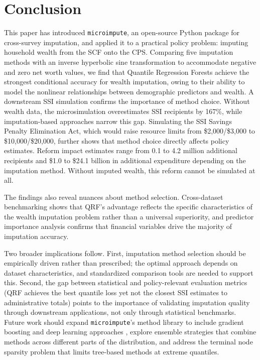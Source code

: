 \section{Conclusion}\label{sec:conclusion}

This paper has introduced \texttt{microimpute}, an open-source Python package for cross-survey imputation, and applied it to a practical policy problem: imputing household wealth from the SCF onto the CPS. Comparing five imputation methods with an inverse hyperbolic sine transformation to accommodate negative and zero net worth values, we find that Quantile Regression Forests achieve the strongest conditional accuracy for wealth imputation, owing to their ability to model the nonlinear relationships between demographic predictors and wealth. A downstream SSI simulation confirms the importance of method choice. Without wealth data, the microsimulation overestimates SSI recipients by 167\%, while imputation-based approaches narrow this gap. Simulating the SSI Savings Penalty Elimination Act, which would raise resource limits from \$2,000/\$3,000 to \$10,000/\$20,000, further shows that method choice directly affects policy estimates. Reform impact estimates range from 0.1 to 4.2 million additional recipients and \$1.0 to \$24.1 billion in additional expenditure depending on the imputation method. Without imputed wealth, this reform cannot be simulated at all.

The findings also reveal nuances about method selection. Cross-dataset benchmarking shows that QRF's advantage reflects the specific characteristics of the wealth imputation problem rather than a universal superiority, and predictor importance analysis confirms that financial variables drive the majority of imputation accuracy.

Two broader implications follow. First, imputation method selection should be empirically driven rather than prescribed; the optimal approach depends on dataset characteristics, and standardized comparison tools are needed to support this. Second, the gap between statistical and policy-relevant evaluation metrics (QRF achieves the best quantile loss yet not the closest SSI estimates to administrative totals) points to the importance of validating imputation quality through downstream applications, not only through statistical benchmarks. Future work should expand \texttt{microimpute}'s method library to include gradient boosting and deep learning approaches \citep{alaa2024deep}, explore ensemble strategies that combine methods across different parts of the distribution, and address the terminal node sparsity problem that limits tree-based methods at extreme quantiles.